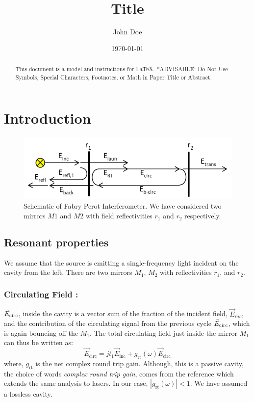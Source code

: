 \documentclass{Resources/cquicc}
\begin{document}
\title{Title}
\author{John Doe}
\date{\today}
\maketitle
\setcounter{tocdepth}{2}
\begin{abstract}
This document is a model and instructions for \LaTeX.
*ADVISABLE: Do Not Use Symbols, Special Characters, Footnotes, 
or Math in Paper Title or Abstract.
\end{abstract}
\section{Introduction}
\lipsum[1]
\begin{figure}[h]
    \centering
    \includegraphics[width=\linewidth]{images/Schematic_of_the_Fabry-Perot_interferometer.png}
    \caption{Schematic of Fabry Perot Interferometer. We have considered two mirrors $M1$ and $M2$ with field reflectivities $r_1$ and $r_2$ respectively. }
    \label{fig:schematic_fp_cavity}
\end{figure}
\subsection{Resonant properties}
We assume that the source is emitting a single-frequency light incident on the cavity from the left. There are two mirrors \textit{$M_1$}, \textit{$M_2$} with reflectivities \textit{$r_1$}, and \textit{$r_2$}. 
\subsubsection{Circulating Field : }$\vec{E}_{\text{\text{circ}}}$, inside the cavity is a vector sum of the fraction of the incident field, $\vec{E}_{\text{}inc}$, and the contribution of the circulating signal from the previous cycle $\vec{E}_{\text{\text{circ}}}$, which is again bouncing off the \textit{$M_1$}. The total circulating field just inside the mirror \textit{$M_1$} can thus be written as:
\begin{equation}
    \vec{E}_{\text{circ}} = j t_1 \vec{E}_{\text{inc}} + g_{\text{rt}}(\omega) \vec{E}_{\text{circ}}
    \label{equation_circulating}
\end{equation}
where, $g_{\text{rt}}$  is the net complex round trip gain. Although, this is a passive cavity, the choice of words \textit{complex round trip gain}, comes from the reference which extends the same analysis to lasers. In our case, $|g_{\text{rt}}(\omega)|<1$. We have assumed a lossless cavity.
\end{document}

